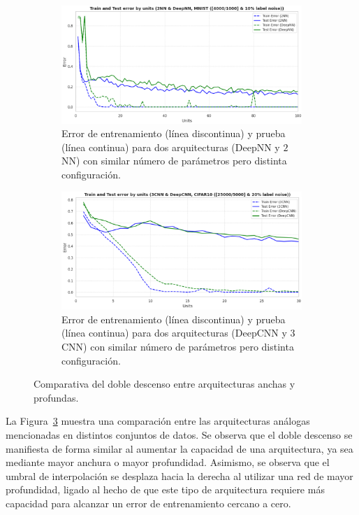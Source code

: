 \begin{figure}[htbp]
    \centering
    \begin{subfigure}[b]{0.42\textwidth}
        \centering
        \includegraphics[width=\textwidth]{img/experiments/2nnvsdeepnn.png}
        \caption{Error de entrenamiento (línea discontinua) y prueba (línea continua) para dos arquitecturas (DeepNN y $2$NN) con similar número de parámetros pero distinta configuración.}\label{fig:2nnvsdeepnn}
    \end{subfigure}
    \hfill 
    \begin{subfigure}[b]{0.42\textwidth} 
        \centering
        \includegraphics[width=\textwidth]{img/experiments/3cnnvsdeepcnn.png}
        \caption{Error de entrenamiento (línea discontinua) y prueba (línea continua) para dos arquitecturas (DeepCNN y $3$CNN) con similar número de parámetros pero distinta configuración.}\label{fig:3cnnvsdeepcnn}
    \end{subfigure}
    
    \caption[Comparativa del doble descenso entre arquitecturas anchas y profundas.]{Comparativa del doble descenso entre arquitecturas anchas y profundas.}\label{fig:width-depth}
\end{figure}

La Figura~\ref{fig:width-depth} muestra una comparación entre las arquitecturas análogas mencionadas en distintos conjuntos de datos. Se observa que el doble descenso se manifiesta de forma similar al aumentar la capacidad de una arquitectura, ya sea mediante mayor anchura o mayor profundidad. Asimismo, se observa que el umbral de interpolación se desplaza hacia la derecha al utilizar una red de mayor profundidad, ligado al hecho de que este tipo de arquitectura requiere más capacidad para alcanzar un error de entrenamiento cercano a cero.\newline

